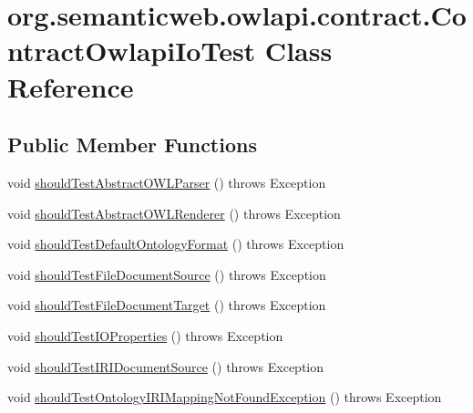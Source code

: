 \hypertarget{classorg_1_1semanticweb_1_1owlapi_1_1contract_1_1_contract_owlapi_io_test}{\section{org.\-semanticweb.\-owlapi.\-contract.\-Contract\-Owlapi\-Io\-Test Class Reference}
\label{classorg_1_1semanticweb_1_1owlapi_1_1contract_1_1_contract_owlapi_io_test}
}
\subsection*{Public Member Functions}
\begin{DoxyCompactItemize}
\item 
void \hyperlink{classorg_1_1semanticweb_1_1owlapi_1_1contract_1_1_contract_owlapi_io_test_abc840efb9cdbc97177e6f27283865391}{should\-Test\-Abstract\-O\-W\-L\-Parser} ()  throws Exception 
\item 
void \hyperlink{classorg_1_1semanticweb_1_1owlapi_1_1contract_1_1_contract_owlapi_io_test_a63933fa56c7361aa593c250feee6f6a2}{should\-Test\-Abstract\-O\-W\-L\-Renderer} ()  throws Exception 
\item 
void \hyperlink{classorg_1_1semanticweb_1_1owlapi_1_1contract_1_1_contract_owlapi_io_test_a4af1bc5ba0d841fab51eea3e85fedf82}{should\-Test\-Default\-Ontology\-Format} ()  throws Exception 
\item 
void \hyperlink{classorg_1_1semanticweb_1_1owlapi_1_1contract_1_1_contract_owlapi_io_test_a465652d9b566e8f144396016800d0104}{should\-Test\-File\-Document\-Source} ()  throws Exception 
\item 
void \hyperlink{classorg_1_1semanticweb_1_1owlapi_1_1contract_1_1_contract_owlapi_io_test_a1b081e977ed4702b1c320e72c3e9b615}{should\-Test\-File\-Document\-Target} ()  throws Exception 
\item 
void \hyperlink{classorg_1_1semanticweb_1_1owlapi_1_1contract_1_1_contract_owlapi_io_test_a0c4c5dfb2844949b6bf94e9788ca07e1}{should\-Test\-I\-O\-Properties} ()  throws Exception 
\item 
void \hyperlink{classorg_1_1semanticweb_1_1owlapi_1_1contract_1_1_contract_owlapi_io_test_a99308a9bffd1d01f72839ba85b85417b}{should\-Test\-I\-R\-I\-Document\-Source} ()  throws Exception 
\item 
void \hyperlink{classorg_1_1semanticweb_1_1owlapi_1_1contract_1_1_contract_owlapi_io_test_a190b4de861f3edbec1e3dd09b30ea869}{should\-Test\-Ontology\-I\-R\-I\-Mapping\-Not\-Found\-Exception} ()  throws Exception 

\end{DoxyCompactItemize}
